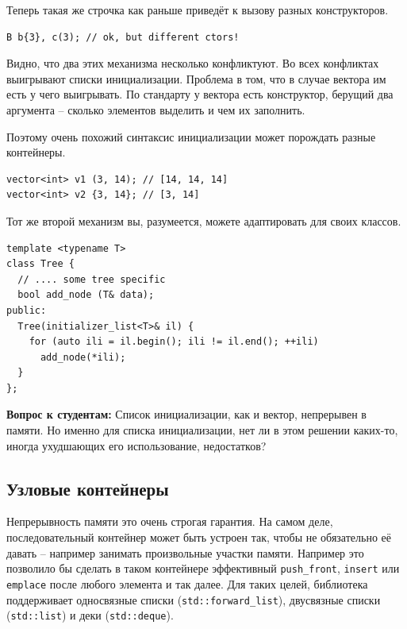 \documentclass[a4paper,12pt,oneside]{article}
\newif\ifanswers
\begin{document}
Теперь такая же строчка как раньше приведёт к вызову разных конструкторов.

\begin{lstlisting}
B b{3}, c(3); // ok, but different ctors!
\end{lstlisting}

Видно, что два этих механизма несколько конфликтуют. Во всех конфликтах выигрывают списки инициализации. Проблема в том, что в случае вектора им есть у чего выигрывать. По стандарту у вектора есть конструктор, берущий два аргумента -- сколько элементов выделить и чем их заполнить.

Поэтому очень похожий синтаксис инициализации может порождать разные контейнеры.

\begin{lstlisting}
vector<int> v1 (3, 14); // [14, 14, 14]
vector<int> v2 {3, 14}; // [3, 14]
\end{lstlisting}

Тот же второй механизм вы, разумеется, можете адаптировать для своих классов.

\begin{lstlisting}
template <typename T>
class Tree {
  // .... some tree specific
  bool add_node (T& data);
public:
  Tree(initializer_list<T>& il) {
    for (auto ili = il.begin(); ili != il.end(); ++ili)
      add_node(*ili);
  }
};
\end{lstlisting}

\textbf{Вопрос к студентам:} Список инициализации, как и вектор, непрерывен в памяти. Но именно для списка инициализации, нет ли в этом решении каких-то, иногда ухудшающих его использование, недостатков?

\ifanswers
Разумеется. Например предполагается, что список инициализации -- нормальный неинтрузивный контейнер. Он хранит копии данных и так далее. Но это означает, что если вы решите написать интрузивный контейнер, вы просто не сможете использовать для него список инициализации. Также такой инициализатор это плохая идея если копирование дорого.
\fi

\pagebreak
\subsection{Узловые контейнеры}\label{sub:NodeCont}

Непрерывность памяти это очень строгая гарантия. На самом деле, последовательный контейнер может быть устроен так, чтобы не обязательно её давать -- например занимать произвольные участки памяти. Например это позволило бы сделать в таком контейнере эффективный \lstinline!push_front!, \lstinline!insert! или \lstinline!emplace! после любого элемента и так далее. Для таких целей, библиотека поддерживает односвязные списки (\lstinline!std::forward_list!), двусвязные списки (\lstinline!std::list!) и деки (\lstinline!std::deque!).
\end{document}
